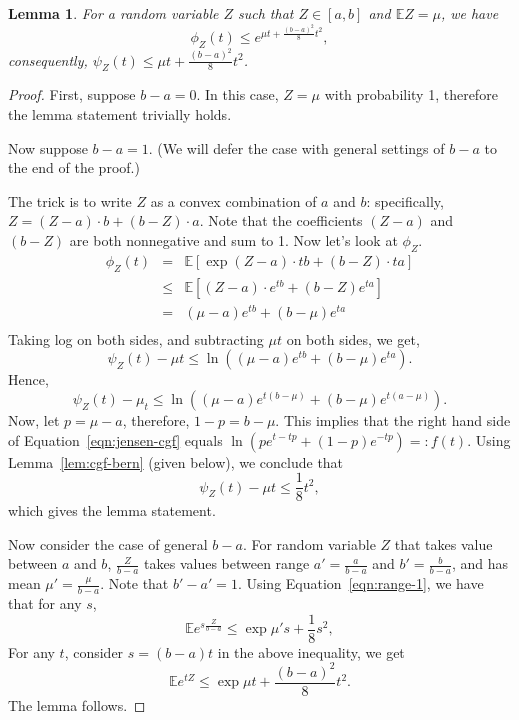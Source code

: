 \documentclass{article}
\newtheorem{lemma}{Lemma}
\newcommand{\EE}{\mathbb{E}} %
\begin{document}
\begin{lemma}
For a random variable $Z$ such that $Z \in [a,b]$ and $\EE Z = \mu$, we have
\[ \phi_Z(t) \leq e^{\mu t + \frac{(b-a)^2}{8} t^2}, \]
consequently,
$\psi_Z(t) \leq \mu t + \frac{(b-a)^2}{8} t^2$.
\label{lem:cgf-hoef}
\end{lemma}
\begin{proof}
First, suppose $b-a = 0$. In this case, $Z = \mu$ with probability 1, therefore
the lemma statement trivially holds.

Now suppose $b-a = 1$. (We will defer the case with general settings of $b-a$ to the end of the proof.)

The trick is to write $Z$ as a convex combination of $a$ and $b$: specifically,
$Z = (Z-a) \cdot b + (b-Z) \cdot a$. Note that the coefficients $(Z-a)$ and $(b-Z)$
are both nonnegative and sum to 1.
Now let's look at $\phi_Z$.
\begin{eqnarray*}
  \phi_Z(t)
  &=& \EE [\exp{ (Z-a) \cdot t b + (b-Z) \cdot t a}] \\
  &\leq& \EE[ (Z-a) \cdot e^{tb} + (b-Z) e^{ta}] \\
  &=& (\mu-a) e^{tb} + (b-\mu) e^{ta} \\
\end{eqnarray*}
Taking log on both sides, and subtracting $\mu t$ on both sides, we get,
\[ \psi_Z(t) - \mu t \leq \ln((\mu-a) e^{tb} + (b-\mu) e^{ta}). \]
Hence,
\begin{equation}
  \psi_Z(t) - \mu_t \leq \ln((\mu-a) e^{t(b-\mu)} + (b-\mu) e^{t(a-\mu)}).
  \label{eqn:jensen-cgf}
\end{equation}
Now, let $p = \mu-a$, therefore, $1-p = b-\mu$. This implies that the right hand
side of Equation~\ref{eqn:jensen-cgf} equals $\ln( p e^{t-tp} + (1-p) e^{-tp} ) =: f(t)$. Using Lemma~\ref{lem:cgf-bern} (given below), we conclude that
\begin{equation}
  \psi_Z(t) - \mu t \leq \frac{1}{8} t^2,
  \label{eqn:range-1}
\end{equation}
which gives the lemma statement.

Now consider the case of general $b-a$. For random variable $Z$ that takes value
between $a$ and $b$, $\frac{Z}{b - a}$ takes values between range $a' = \frac{a}{b-a}$ and $b' = \frac{b}{b-a}$, and has mean $\mu' = \frac{\mu}{b-a}$.
Note that $b' - a' = 1$. Using Equation~\ref{eqn:range-1}, we have that for any $s$,
\[ \EE e^{s \frac{Z}{b - a}} \leq \exp{\mu' s + \frac{1}{8} s^2 }, \]
For any $t$, consider $s = (b-a)t$ in the above inequality, we get
\[ \EE e^{t Z} \leq \exp{\mu t + \frac{(b-a)^2}{8} t^2 }. \]
The lemma follows.
\end{proof}
\end{document}
